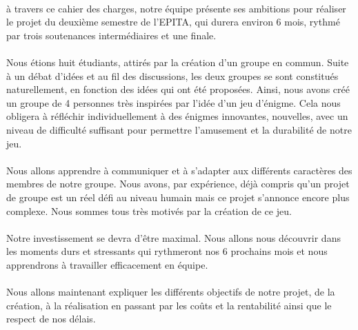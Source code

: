 \documentclass{article}
\begin{document}
	\paragraph{}
    à travers ce cahier des charges, notre équipe présente ses ambitions pour réaliser le projet du deuxième semestre de l'EPITA, qui durera environ 6 mois, rythmé par trois soutenances intermédiaires et une finale.
	
	\paragraph{}
    Nous étions huit étudiants, attirés par la création d'un groupe en commun. Suite à un débat d'idées et au fil des discussions, les deux groupes se sont constitués naturellement, en fonction des idées qui ont été proposées. Ainsi, nous avons créé un groupe de 4 personnes très inspirées par l'idée d'un jeu d'énigme. Cela nous obligera à réfléchir individuellement à des énigmes innovantes, nouvelles, avec un niveau de difficulté suffisant pour permettre l'amusement et la durabilité de notre jeu.
	
	\paragraph{}
    Nous allons apprendre à communiquer et à s'adapter aux différents caractères des membres de notre groupe. Nous avons, par expérience, déjà compris qu'un projet de groupe est un réel défi au niveau humain mais ce projet s'annonce encore plus complexe.
    Nous sommes tous très motivés par la création de ce jeu.
	
	\paragraph{}
    Notre investissement se devra d'être maximal. Nous allons nous découvrir dans les moments durs et stressants qui rythmeront nos 6 prochains mois et nous apprendrons à travailler efficacement en équipe.

	\paragraph{}
    Nous allons maintenant expliquer les différents objectifs de notre projet, de la création, à la réalisation en passant par les coûts et la rentabilité ainsi que le respect de nos délais.

\newpage
{}
\end{document}
